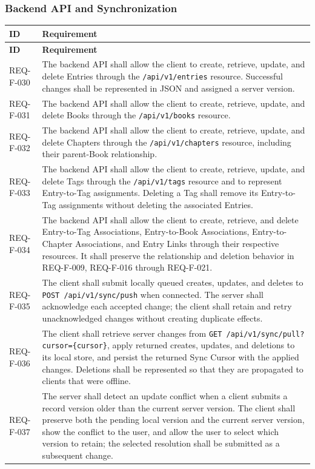\documentclass[11pt,a4paper]{article}
\begin{document}
\subsubsection{Backend API and Synchronization}
\begin{longtable}{|L{2.2cm}|L{13.6cm}|}
\hline \textbf{ID} & \textbf{Requirement} \\
\hline
\endfirsthead
\hline \textbf{ID} & \textbf{Requirement} \\
\hline
\endhead
REQ-F-030 & The backend API shall allow the client to create, retrieve, update, and delete Entries through the \texttt{/api/v1/entries} resource. Successful changes shall be represented in JSON and assigned a server version. \\ \hline
REQ-F-031 & The backend API shall allow the client to create, retrieve, update, and delete Books through the \texttt{/api/v1/books} resource. \\ \hline
REQ-F-032 & The backend API shall allow the client to create, retrieve, update, and delete Chapters through the \texttt{/api/v1/chapters} resource, including their parent-Book relationship. \\ \hline
REQ-F-033 & The backend API shall allow the client to create, retrieve, update, and delete Tags through the \texttt{/api/v1/tags} resource and to represent Entry-to-Tag assignments. Deleting a Tag shall remove its Entry-to-Tag assignments without deleting the associated Entries. \\ \hline
REQ-F-034 & The backend API shall allow the client to create, retrieve, and delete Entry-to-Tag Associations, Entry-to-Book Associations, Entry-to-Chapter Associations, and Entry Links through their respective resources. It shall preserve the relationship and deletion behavior in REQ-F-009, REQ-F-016 through REQ-F-021. \\ \hline
REQ-F-035 & The client shall submit locally queued creates, updates, and deletes to \texttt{POST /api/v1/sync/push} when connected. The server shall acknowledge each accepted change; the client shall retain and retry unacknowledged changes without creating duplicate effects. \\ \hline
REQ-F-036 & The client shall retrieve server changes from \texttt{GET /api/v1/sync/pull?cursor=\{cursor\}}, apply returned creates, updates, and deletions to its local store, and persist the returned Sync Cursor with the applied changes. Deletions shall be represented so that they are propagated to clients that were offline. \\ \hline
REQ-F-037 & The server shall detect an update conflict when a client submits a record version older than the current server version. The client shall preserve both the pending local version and the current server version, show the conflict to the user, and allow the user to select which version to retain; the selected resolution shall be submitted as a subsequent change. \\ \hline
\end{longtable}
\end{document}
